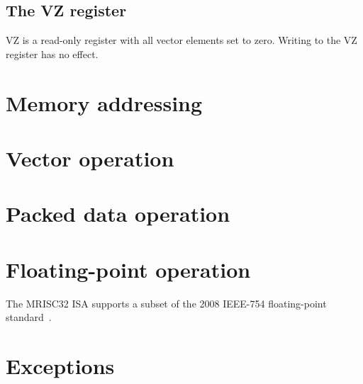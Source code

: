 \subsection{The VZ register}

VZ is a read-only register with all vector elements set to zero. Writing to the
VZ register has no effect.

\section{Memory addressing}

\tbd

\section{Vector operation}

\tbd

\section{Packed data operation}

\tbd

\section{Floating-point operation}

The MRISC32 ISA supports a subset of the 2008 IEEE-754 floating-point
standard~\cite{ieee754-2008}.

\tbd

\section{Exceptions}

\tbd
